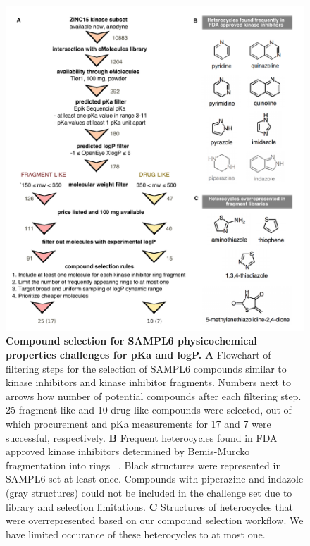 \documentclass[9pt,lineno]{elife}
\begin{document}
\begin{figure}
\begin{center}
\includegraphics[width=0.95\linewidth]{figures/compound_selection_figure.pdf}
\caption{{\bf Compound selection for SAMPL6 physicochemical properties challenges for pKa and logP.} \textbf{A} Flowchart of filtering steps for the selection of SAMPL6 compounds similar to kinase inhibitors and kinase inhibitor fragments. Numbers next to arrows how number of potential compounds after each filtering step. 25 fragment-like and 10 drug-like compounds were selected, out of which procurement and pKa measurements for 17 and 7 were successful, respectively.   \textbf{B} Frequent heterocycles found in FDA approved kinase inhibitors determined by Bemis-Murcko fragmentation into rings  ~\citep{bemis_properties_1996}. Black structures were represented in SAMPL6 set at least once. Compounds with piperazine and indazole (gray structures) could not be included in the challenge set due to library and selection limitations.  \textbf{C} Structures of heterocycles that were overrepresented based on our compound selection workflow. We have limited occurance of these heterocycles to at most one.
}
\label{fig:compound_selection_figure}
\end{center}
\end{figure}
\end{document}
